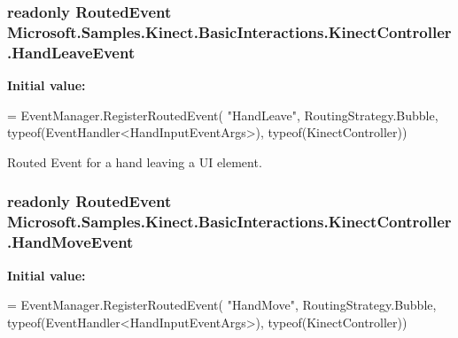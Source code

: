 \hypertarget{class_microsoft_1_1_samples_1_1_kinect_1_1_basic_interactions_1_1_kinect_controller_aa68d28645179f33282af2b14dc9259db}{
\subsubsection[{Hand\-Leave\-Event}]{\setlength{\rightskip}{0pt plus 5cm}readonly Routed\-Event Microsoft.\-Samples.\-Kinect.\-Basic\-Interactions.\-Kinect\-Controller.\-Hand\-Leave\-Event\hspace{0.3cm}{\ttfamily [static]}}}\label{class_microsoft_1_1_samples_1_1_kinect_1_1_basic_interactions_1_1_kinect_controller_aa68d28645179f33282af2b14dc9259db}
{\bfseries Initial value\-:}
\begin{DoxyCode}
= EventManager.RegisterRoutedEvent(
            \textcolor{stringliteral}{"HandLeave"},
            RoutingStrategy.Bubble,
            typeof(EventHandler<HandInputEventArgs>),
            typeof(KinectController))
\end{DoxyCode}


Routed Event for a hand leaving a U\-I element. 

\hypertarget{class_microsoft_1_1_samples_1_1_kinect_1_1_basic_interactions_1_1_kinect_controller_a35521ac87a13188ea5c027cbe15e8938}{
\subsubsection[{Hand\-Move\-Event}]{\setlength{\rightskip}{0pt plus 5cm}readonly Routed\-Event Microsoft.\-Samples.\-Kinect.\-Basic\-Interactions.\-Kinect\-Controller.\-Hand\-Move\-Event\hspace{0.3cm}{\ttfamily [static]}}}\label{class_microsoft_1_1_samples_1_1_kinect_1_1_basic_interactions_1_1_kinect_controller_a35521ac87a13188ea5c027cbe15e8938}
{\bfseries Initial value\-:}
\begin{DoxyCode}
= EventManager.RegisterRoutedEvent(
            \textcolor{stringliteral}{"HandMove"},
            RoutingStrategy.Bubble,
            typeof(EventHandler<HandInputEventArgs>),
            typeof(KinectController))
\end{DoxyCode}


